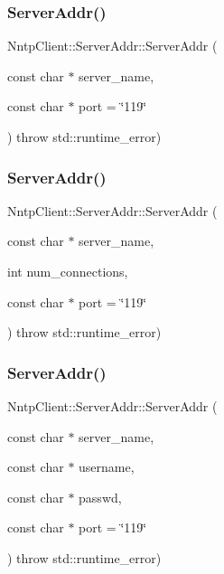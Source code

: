 \subsubsection{\texorpdfstring{Server\+Addr()}{ServerAddr()}\hspace{0.1cm}{\footnotesize\ttfamily [3/6]}}
{\footnotesize\ttfamily Nntp\+Client\+::\+Server\+Addr\+::\+Server\+Addr (\begin{DoxyParamCaption}\item[{const char $\ast$}]{server\+\_\+name,  }\item[{const char $\ast$}]{port = {\ttfamily \char`\"{}119\char`\"{}} }\end{DoxyParamCaption}) throw  std\+::runtime\+\_\+error) }

\hypertarget{class_nntp_client_1_1_server_addr_a4eb21b6350512f1a6edeb3571feafc7a}{}\label{class_nntp_client_1_1_server_addr_a4eb21b6350512f1a6edeb3571feafc7a} 
\subsubsection{\texorpdfstring{Server\+Addr()}{ServerAddr()}\hspace{0.1cm}{\footnotesize\ttfamily [4/6]}}
{\footnotesize\ttfamily Nntp\+Client\+::\+Server\+Addr\+::\+Server\+Addr (\begin{DoxyParamCaption}\item[{const char $\ast$}]{server\+\_\+name,  }\item[{int}]{num\+\_\+connections,  }\item[{const char $\ast$}]{port = {\ttfamily \char`\"{}119\char`\"{}} }\end{DoxyParamCaption}) throw  std\+::runtime\+\_\+error) }

\hypertarget{class_nntp_client_1_1_server_addr_a1aadb75cf311cb757b27e43b4cae4e7f}{}\label{class_nntp_client_1_1_server_addr_a1aadb75cf311cb757b27e43b4cae4e7f} 
\subsubsection{\texorpdfstring{Server\+Addr()}{ServerAddr()}\hspace{0.1cm}{\footnotesize\ttfamily [5/6]}}
{\footnotesize\ttfamily Nntp\+Client\+::\+Server\+Addr\+::\+Server\+Addr (\begin{DoxyParamCaption}\item[{const char $\ast$}]{server\+\_\+name,  }\item[{const char $\ast$}]{username,  }\item[{const char $\ast$}]{passwd,  }\item[{const char $\ast$}]{port = {\ttfamily \char`\"{}119\char`\"{}} }\end{DoxyParamCaption}) throw  std\+::runtime\+\_\+error) }

